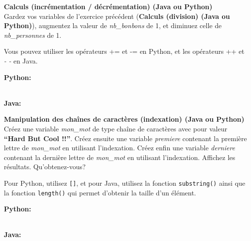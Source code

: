 \begin{Exercice}[5 minutes] \textbf{Calculs (incrémentation / décrémentation) (Java ou Python)}\\
   Gardez vos variables de l'exercice précédent (\textbf{Calculs (division) (Java ou Python)}), augmentez la valeur de \textit{nb\_bonbons} de 1, et diminuez celle de \textit{nb\_personnes} de 1.  \\
   
    \begin{conseil}
      	Vous pouvez utiliser les opérateurs += et -= en Python, et les opérateurs ++ et \textit{- -} en Java.
        
    \end{conseil}
    \begin{solution}
    
    \textbf{Python:}
    
    
    \textbf{\\Java:}
    
           
    \end{solution}   
\end{Exercice}

\begin{Exercice}[5 minutes] \textbf{Manipulation des chaînes de caractères (indexation) (Java ou Python)}\\
   Créez une variable \textit{mon\_mot} de type chaîne de caractères avec pour valeur \textbf{``Hard But Cool !!''}. Créez ensuite une variable \textit{premiere} contenant la première lettre de \textit{mon\_mot} en utilisant l'indexation. Créez enfin une variable \textit{derniere} contenant la dernière lettre de \textit{mon\_mot} en utilisant l'indexation. Affichez les résultats. Qu'obtenez-vous? \\
   
    \begin{conseil}
      	Pour Python, utilisez \lstinline{[]}, et pour Java, utilisez la fonction \lstinline{substring()} ainsi que la fonction \lstinline{length()} qui permet d'obtenir la taille d'un élément.
        
    \end{conseil}
    \begin{solution}
    
    \textbf{Python:}
    
    
    \textbf{\\Java:}
    
           
    \end{solution}   
\end{Exercice}

